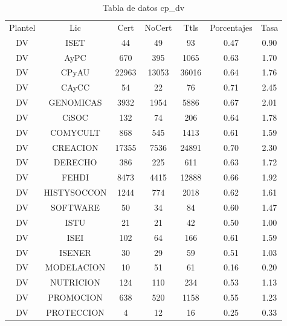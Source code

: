 \documentclass{article}
\begin{document}
\begin{table}[h]
\centering
\begin{tabular}{ccccccc}

Plantel & Lic & Cert & NoCert & Ttls & Porcentajes & Tasa \\

DV & ISET & 44 & 49 & 93 & 0.47 & 0.90 \\
DV & AyPC & 670 & 395 & 1065 & 0.63 & 1.70 \\
DV & CPyAU & 22963 & 13053 & 36016 & 0.64 & 1.76 \\
DV & CAyCC & 54 & 22 & 76 & 0.71 & 2.45 \\
DV & GENOMICAS & 3932 & 1954 & 5886 & 0.67 & 2.01 \\
DV & CiSOC & 132 & 74 & 206 & 0.64 & 1.78 \\
DV & COMYCULT & 868 & 545 & 1413 & 0.61 & 1.59 \\
DV & CREACION & 17355 & 7536 & 24891 & 0.70 & 2.30 \\
DV & DERECHO & 386 & 225 & 611 & 0.63 & 1.72 \\
DV & FEHDI & 8473 & 4415 & 12888 & 0.66 & 1.92 \\
DV & HISTYSOCCON & 1244 & 774 & 2018 & 0.62 & 1.61 \\
DV & SOFTWARE & 50 & 34 & 84 & 0.60 & 1.47 \\
DV & ISTU & 21 & 21 & 42 & 0.50 & 1.00 \\
DV & ISEI & 102 & 64 & 166 & 0.61 & 1.59 \\
DV & ISENER & 30 & 29 & 59 & 0.51 & 1.03 \\
DV & MODELACION & 10 & 51 & 61 & 0.16 & 0.20 \\
DV & NUTRICION & 124 & 110 & 234 & 0.53 & 1.13 \\
DV & PROMOCION & 638 & 520 & 1158 & 0.55 & 1.23 \\
DV & PROTECCION & 4 & 12 & 16 & 0.25 & 0.33 \\

\end{tabular}
\caption{Tabla de datos cp\_dv}
\end{table}
\end{document}
